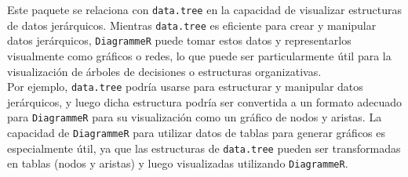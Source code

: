 \documentclass[12pt]{report}\usepackage[]{graphicx}\usepackage[dvipsnames]{xcolor}
\begin{document}
		 	Este paquete se relaciona con \texttt{data.tree} en la capacidad de visualizar estructuras de datos jerárquicos. Mientras \texttt{data.tree} es eficiente para crear y manipular datos jerárquicos, \texttt{DiagrammeR} puede tomar estos datos y representarlos visualmente como gráficos o redes, lo que puede ser particularmente útil para la visualización de árboles de decisiones o estructuras organizativas.\\
		 	
		 	Por ejemplo, \texttt{data.tree} podría usarse para estructurar y manipular datos jerárquicos, y luego dicha estructura podría ser convertida a un formato adecuado para \texttt{DiagrammeR} para su visualización como un gráfico de nodos y aristas. La capacidad de \texttt{DiagrammeR} para utilizar datos de tablas para generar gráficos es especialmente útil, ya que las estructuras de \texttt{data.tree} pueden ser transformadas en tablas (nodos y aristas) y luego visualizadas utilizando \texttt{DiagrammeR}.
 	
\end{document}
